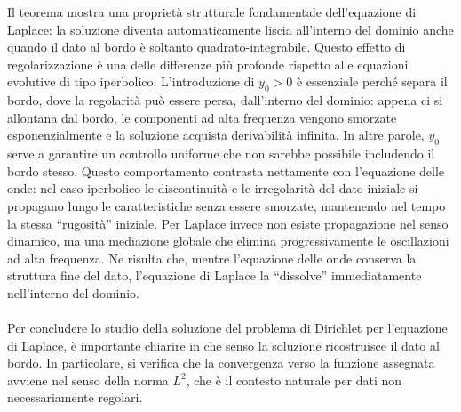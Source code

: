 \documentclass[a4paper,12pt]{report}
\begin{document}
Il teorema mostra una proprietà strutturale fondamentale dell’equazione di Laplace: la soluzione diventa automaticamente liscia all’interno del dominio anche quando il dato al bordo è soltanto quadrato-integrabile. Questo effetto di regolarizzazione è una delle differenze più profonde rispetto alle equazioni evolutive di tipo iperbolico. L’introduzione di \(y_0>0\) è essenziale perché separa il bordo, dove la regolarità può essere persa, dall’interno del dominio: appena ci si allontana dal bordo, le componenti ad alta frequenza vengono smorzate esponenzialmente e la soluzione acquista derivabilità infinita. In altre parole, \(y_0\) serve a garantire un controllo uniforme che non sarebbe possibile includendo il bordo stesso. Questo comportamento contrasta nettamente con l’equazione delle onde: nel caso iperbolico le discontinuità e le irregolarità del dato iniziale si propagano lungo le caratteristiche senza essere smorzate, mantenendo nel tempo la stessa “rugosità” iniziale. Per Laplace invece non esiste propagazione nel senso dinamico, ma una mediazione globale che elimina progressivamente le oscillazioni ad alta frequenza. Ne risulta che, mentre l’equazione delle onde conserva la struttura fine del dato, l’equazione di Laplace la “dissolve” immediatamente nell’interno del dominio.
\\
\\Per concludere lo studio della soluzione del problema di Dirichlet per l’equazione di Laplace, è importante chiarire in che senso la soluzione ricostruisce il dato al bordo. In particolare, si verifica che la convergenza verso la funzione assegnata avviene nel senso della norma $L^2$, che è il contesto naturale per dati non necessariamente regolari.
\end{document}
